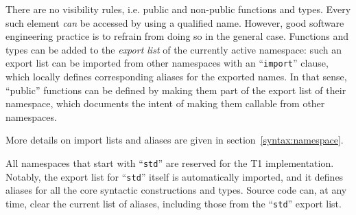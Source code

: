 There are no visibility rules, i.e. public and non-public functions and
types. Every such element \emph{can} be accessed by using a qualified
name. However, good software engineering practice is to refrain from
doing so in the general case. Functions and types can be added to the
\emph{export list} of the currently active namespace: such an export
list can be imported from other namespaces with an ``\verb|import|''
clause, which locally defines corresponding aliases for the exported
names. In that sense, ``public'' functions can be defined by making them
part of the export list of their namespace, which documents the intent
of making them callable from other namespaces.

More details on import lists and aliases are given in
section~\ref{syntax:namespace}.

All namespaces that start with ``\verb|std|'' are reserved for the T1
implementation. Notably, the export list for ``\verb|std|'' itself is
automatically imported, and it defines aliases for all the core
syntactic constructions and types. Source code can, at any time, clear
the current list of aliases, including those from the ``\verb|std|''
export list.
